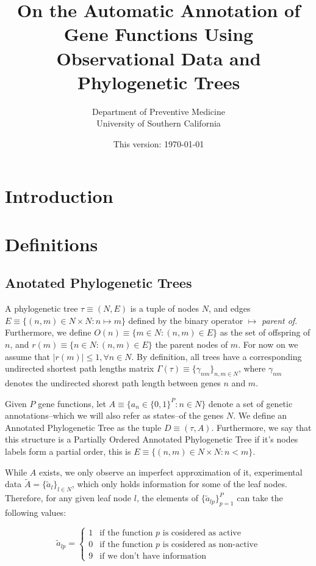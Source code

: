 \documentclass[12pt]{article}
\title{On the Automatic Annotation of Gene Functions Using Observational Data and Phylogenetic Trees}
\author{Department of Preventive Medicine\\University of Southern California}
\date{This version: \today}
\begin{document}
\maketitle

\section{Introduction}

\section{Definitions}

\subsection{Anotated Phylogenetic Trees}

A phylogenetic tree $\tau\equiv (N,E)$ is a tuple of nodes $N$, and edges $E\equiv \{(n, m) \in N\times N: n\mapsto m\}$ defined by the binary operator $\mapsto$ \emph{parent of}. Furthermore, we define $O(n)\equiv\{m\in N: (n, m) \in E\}$ as the set of offspring of $n$, and $r(m) \equiv\{n \in N: (n, m) \in E\}$ the parent nodes of $m$. For now on we assume that $|r(m)| \leq 1,\forall n\in N$. By definition, all trees have a corresponding undirected shortest path lengths matrix $\Gamma(\tau) \equiv \{\gamma_{nm}\}_{n,m\in N}$, where $\gamma_{nm}$ denotes the undirected shorest path length between genes $n$ and $m$. 

Given $P$ gene functions, let $A \equiv \{a_n \in \{0,1\}^P: n\in N\}$ denote a set of genetic annotations--which we will also refer as states--of the genes $N$. We define an Annotated Phylogenetic Tree as the tuple $D \equiv(\tau, A)$. Furthermore, we say that this structure is a Partially Ordered Annotated Phylogenetic Tree if it's nodes labels form a partial order, this is $E\equiv \{(n, m) \in N\times N: n < m\}$.

While $A$ exists, we only observe an imperfect approximation of it, experimental data $\tilde A = \{\tilde a_l\}_{l\in N}$, which only holds information for some of the leaf nodes. Therefore, for any given leaf node $l$, the elements of $\{\tilde a_{lp}\}_{p=1}^P$ can take the following values:

$$
\tilde a_{lp} = \left\{
\begin{array}{ll}
1 & \mbox{if the function }p\mbox{ is cosidered as active}\\
0 & \mbox{if the function }p\mbox{ is cosidered as non-active}\\
9 & \mbox{if we don't have information }
\end{array}\right.
$$
\end{document}
